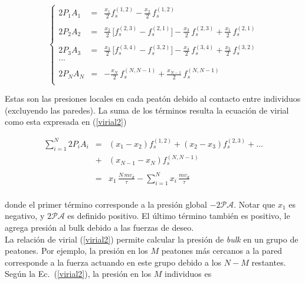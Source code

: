 \begin{equation}
\left\{\begin{array}{lcl}
2P_1A_1 
& = &\displaystyle\frac{x_{1}}{2}f_s^ { (1 , 2)} - 
\displaystyle\frac{x_{2}}{2}\,f_s^ { (1 , 2) }  \\
&& \\
2P_2A_2 
& = &\displaystyle\frac{x_{2}}{2}\,\big[f_s^ { (2 , 3)} - f_s^{(2,1)} 
\big] - \displaystyle\frac{x_{3}}{2}\,f_s^ { (2 , 3) } +\displaystyle\frac 
{ x_ {1}}{2}\,f_s^{(2,1) 
} \\
&& \\
2P_3A_3 
& = &\displaystyle\frac{x_{3}}{2}\,\big[f_s^ { (3 , 4)} - f_s^{(3,2)} 
\big] - \displaystyle\frac{x_{4}}{2}\,f_s^ { (3 , 4) } +\displaystyle\frac 
{ x_{2}}{2}\,f_s^{(3,2) 
} \\
... &&\\
&& \\
2P_NA_N 
& = &-\displaystyle\frac{x_{N}}{2}\, f_s^{(N,N-1)} 
+\displaystyle\frac{ x_{N-1}}{2}\,f_s^{(N,N-1) 
} \\
 \end{array}\right.\label{eqn_11}
\end{equation}

Estas son las presiones locales en cada peatón debido al contacto entre individuos (excluyendo las paredes). La suma de los términos resulta la ecuación de virial como esta expresada en (\ref{virial2})

\begin{equation}
\begin{array}{lcl}
\displaystyle\sum_{i=1}^N 2P_iA_i & = & (x_1 - x_2)f_s^{(1,2)} + (x_2 - 
x_3)f_s^{(2,3)} +... \\
& + &  (x_{N-1}-x_N)f_s^{(N,N-1)} \\
&& \\
& = & x_{1}\,\displaystyle\frac{N\,mv_d}{\tau} - 
\displaystyle\sum_{i=1}^N x_i\,\displaystyle\frac{mv_d}{\tau} \\
 \end{array}\label{eqn_12}
\end{equation}

\noindent donde el primer término corresponde a la presión global
$-2\mathcal{PA}$. Notar que $x_1$ es negativo, y $2\mathcal{PA}$ es definido positivo. El último término también es positivo, le agrega presión al bulk debido a las fuerzas de deseo.  
\\
La relación de virial (\ref{virial2}) permite calcular la presión de \textit{bulk} en un grupo de peatones. Por ejemplo, la presión en los  $M$ peatones más cercanos a la pared corresponde a la fuerza actuando en este grupo debido a los $N-M$ restantes. Según la Ec.~(\ref{virial2}), la presión en los $M$ individuos es


